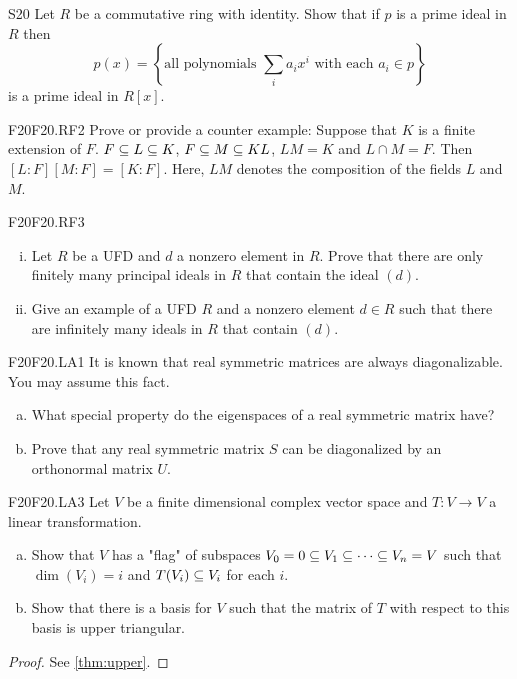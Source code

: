 \documentclass[../AlgebraQualSolutions.tex]{subfiles}
\begin{document}
\begin{prob}{S20}{}
Let $R$ be a commutative ring with identity. Show that if $p$ is a prime ideal in $R$ then
	\[p(x) = \left\{\textrm{all polynomials } \sum_i a_ix^i \textrm{ with each } a_i \in p \right\} \]
is a prime ideal in $R[x]$.
\end{prob}

\begin{prob}{F20}{F20.RF2}
Prove or provide a counter example: Suppose that $K$ is a finite extension of $F$. $F \subseteq L \subseteq K$, $F \subseteq M \subseteq KL$, $LM = K$ and $L \cap M = F$. Then $[L:F][M:F] = [K:F]$. Here, $LM$ denotes the composition of the fields $L$ and $M$.
\end{prob}

\begin{prob}{F20}{F20.RF3}
	\begin{enumerate}[(i)]
	\item Let $R$ be a UFD and $d$ a nonzero element in $R$. Prove that there are only finitely many principal ideals  in $R$ that contain the ideal $(d)$.
	\item Give an example of a UFD $R$ and a nonzero element $d \in R$ such that there are infinitely many ideals in $R$ that contain $(d)$.
	\end{enumerate}
\end{prob}

\begin{prob}{F20}{F20.LA1}
It is known that real symmetric matrices are always diagonalizable. You may assume this fact.
\begin{enumerate}[(a)]
\item What special property do the eigenspaces of a real symmetric matrix have?
\item Prove that any real symmetric matrix $S$ can be diagonalized by an orthonormal matrix $U$.
\end{enumerate}
\end{prob}

\begin{prob}{F20}{F20.LA3}
Let $V$ be a finite dimensional complex vector space and $T: V \to V$ a linear transformation.
\begin{enumerate}[(a)]
\item Show that $V$ has a "flag" of subspaces $V_0 = 0 \subseteq V_1 \subseteq \cdots \subseteq V_n = V$ such that $\dim(V_i) = i$ and $T(V_i) \subseteq V_i$ for each $i$.
\item Show that there is a basis for $V$ such that the matrix of $T$ with respect to this basis is upper triangular.
\end{enumerate}
\end{prob}

\begin{proof}
	See \ref{thm:upper}.
\end{proof}
\end{document}
